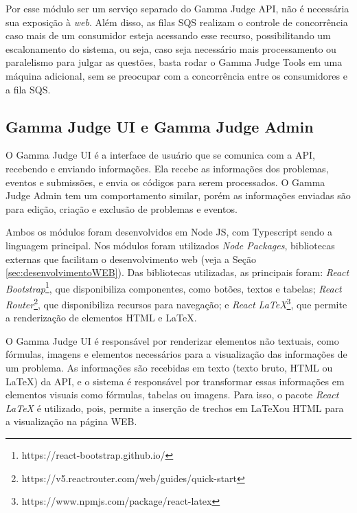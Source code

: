 Por esse módulo ser um serviço separado do Gamma Judge API, não é necessária sua exposição à \textit{web}. Além disso, as filas SQS realizam o controle de concorrência caso mais de um consumidor esteja acessando esse recurso, possibilitando um escalonamento do sistema, ou seja, caso seja necessário mais processamento ou paralelismo para julgar as questões, basta rodar o Gamma Judge Tools em uma máquina adicional, sem se preocupar com a concorrência entre os consumidores e a fila SQS. 

\subsection{Gamma Judge UI e Gamma Judge Admin} 
\label{subsec:arquitetura_judge_ui}

O Gamma Judge UI é a interface de usuário que se comunica com a API, recebendo e enviando informações. Ela recebe as informações dos problemas, eventos e submissões, e envia os códigos para serem processados. O Gamma Judge Admin tem um comportamento similar, porém as informações enviadas são para edição, criação e exclusão de problemas e eventos. 

Ambos os módulos foram desenvolvidos em Node JS, com Typescript sendo a linguagem principal. Nos módulos foram utilizados \textit{Node Packages}, bibliotecas externas que facilitam o desenvolvimento web (veja a Seção \ref{sec:desenvolvimentoWEB}). Das bibliotecas utilizadas, as principais foram: \textit{React Bootstrap}\footnote{https://react-bootstrap.github.io/}, que disponibiliza componentes, como botões, textos e tabelas; \textit{React Router}\footnote{https://v5.reactrouter.com/web/guides/quick-start}, que disponibiliza recursos para navegação; e \textit{React \LaTeX}\footnote{https://www.npmjs.com/package/react-latex}, que permite a renderização de elementos HTML e \LaTeX.

O Gamma Judge UI é responsável por renderizar elementos não textuais, como fórmulas, imagens e elementos necessários para a visualização das informações de um problema. As informações são recebidas em texto (texto bruto, HTML ou \LaTeX) da API, e o sistema é responsável por transformar essas informações em elementos visuais como fórmulas, tabelas ou imagens. Para isso, o pacote \textit{React \LaTeX} é utilizado, pois, permite a inserção de trechos em \LaTeX ou HTML para a visualização na página WEB.


